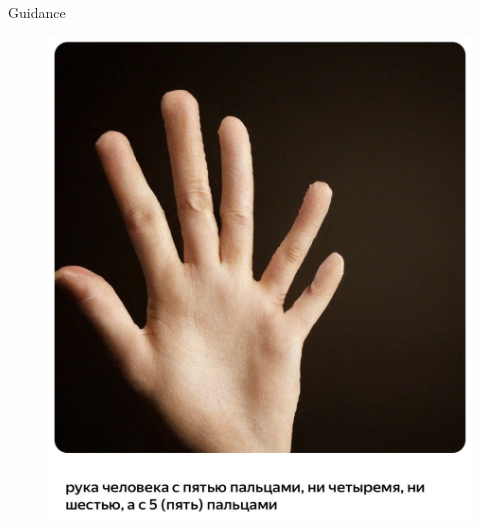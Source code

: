 \begin{frame}{Guidance}
\begin{minipage}[t]{0.5\columnwidth}
\begin{figure}
			\includegraphics[width=0.9\linewidth]{figs/shedevrum2}
		\end{figure}
	\end{minipage}
\end{frame}
